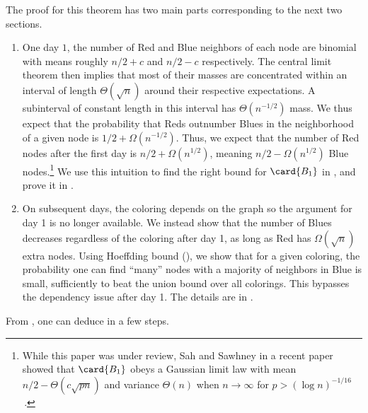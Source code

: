 \documentclass{toc}
\begin{document}
			The proof for this theorem has two main parts corresponding to the next two sections.
			\begin{enumerate}
				\item One day $1$, the number of Red and Blue neighbors of each node are binomial with means roughly 
				$n/2 + c$ and $n/2 - c$ respectively.
				The central limit theorem then implies that most of their masses are concentrated within an interval of length
				$\Theta (\sqrt n)$ around their respective expectations.
				A subinterval of constant length in this interval has $\Theta (n^{-1/2})$ mass.
				We thus expect that the probability that Reds outnumber Blues in 
				the neighborhood of a given node %
				is %
				$1/2 + \Omega (n^{-1/2})$. Thus, we expect that the number of Red nodes after the first day is $n/2 + \Omega (n^{1/2})$, meaning $n/2 - \Omega (n^{1/2})$ Blue nodes.\footnote[1]{While this paper was under review, Sah and Sawhney in a recent paper \cite{sahsawhney2021} showed that $\card{B_1}$ obeys a Gaussian limit law with mean $n/2 - \Theta(c\sqrt{pn})$ and variance $\Theta(n)$ when $n\to \infty$ for $p > (\log n)^{-1/16}$\,.}
				We use this intuition to find the right bound for $\card{B_1}$ in , and prove it in .
				
				\item On subsequent days, the coloring depends on the graph so the argument for day 1 is no longer available.
				We instead show that the number of Blues decreases %
				regardless of the coloring after day 1, as long as Red has $\Omega(\sqrt{n})$ extra nodes.
				Using Hoeffding bound (), we show that for a given coloring, the probability one can find ``many'' nodes with a majority of neighbors in Blue is small, %
				sufficiently  %
				to beat the union bound over all colorings.
				This bypasses the dependency issue after day 1.
				The details are in .
			\end{enumerate}
			
			From , one can deduce   in a few steps.
			
\end{document}
